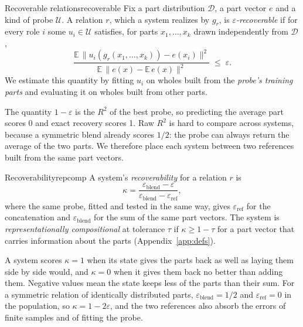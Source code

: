 \documentclass[10pt]{article}
\theoremstyle{plain}
\theoremstyle{remark}
\newcommand{\U}{\mathcal{U}}
\newcommand{\D}{\mathcal{D}}
\begin{document}
\begin{defbox}{Recoverable relations}{recoverable}
Fix a part distribution $\D$, a part vector $e$ and a kind of probe $\U$. A relation $r$, which a system realizes by $g_r$, is \emph{$\varepsilon$-recoverable} if for every role $i$ some $u_i \in \U$ satisfies, for parts $x_1, \ldots, x_k$ drawn independently from $\D$,
\begin{equation}
  \frac{\mathbb{E}\,\lVert u_i(g_r(x_1,\ldots,x_k)) - e(x_i) \rVert^2}{\mathbb{E}\,\lVert e(x) - \mathbb{E}\,e(x) \rVert^2} \;\le\; \varepsilon .
  \label{eq:recover}
\end{equation}
We estimate this quantity by fitting $u_i$ on wholes built from the \emph{probe's training parts} and evaluating it on wholes built from other parts.
\end{defbox}

The quantity $1 - \varepsilon$ is the $R^2$ of the best probe, so predicting the average part scores 0 and exact recovery scores 1. Raw $R^2$ is hard to compare across systems, because a symmetric blend already scores $1/2$: the probe can always return the average of the two parts. We therefore place each system between two references built from the same part vectors.

\begin{defbox}{Recoverability}{repcomp}
A system's \emph{recoverability} for a relation $r$ is
\begin{equation}
  \kappa = \frac{\varepsilon_{\mathrm{blend}} - \varepsilon}{\varepsilon_{\mathrm{blend}} - \varepsilon_{\mathrm{ref}}},
  \label{eq:kappa}
\end{equation}
where the same probe, fitted and tested in the same way, gives $\varepsilon_{\mathrm{ref}}$ for the concatenation and $\varepsilon_{\mathrm{blend}}$ for the sum of the same part vectors. The system is \emph{representationally compositional} at tolerance $\tau$ if $\kappa \ge 1 - \tau$ for a part vector that carries information about the parts (Appendix~\ref{app:defs}).
\end{defbox}

A system scores $\kappa = 1$ when its state gives the parts back as well as laying them side by side would, and $\kappa = 0$ when it gives them back no better than adding them. Negative values mean the state keeps less of the parts than their sum. For a symmetric relation of identically distributed parts, $\varepsilon_{\mathrm{blend}} = 1/2$ and $\varepsilon_{\mathrm{ref}} = 0$ in the population, so $\kappa = 1 - 2\varepsilon$, and the two references also absorb the errors of finite samples and of fitting the probe.
\end{document}
